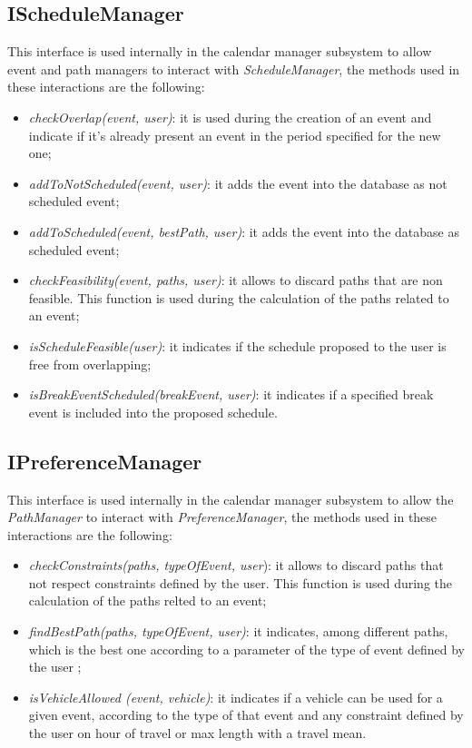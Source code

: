 \subsection{IScheduleManager}
This interface is used internally in the calendar manager subsystem to allow event and path managers to interact with \textit{ScheduleManager}, the methods used in these interactions are the following:
\begin{itemize}
\item \textit{checkOverlap(event, user)}: it is used during the creation of an event and indicate if it's already present an event in the period specified for the new one;
\item \textit{addToNotScheduled(event, user)}: it adds the event into the database as not scheduled event;
\item \textit{addToScheduled(event, bestPath, user)}: it adds the event into the database as scheduled event;
\item \textit{checkFeasibility(event, paths, user)}: it allows to discard paths that are non feasible. This function is used during the calculation of the paths related to an event;
\item \textit{isScheduleFeasible(user)}: it indicates if the schedule proposed to the user is free from overlapping;
\item \textit{isBreakEventScheduled(breakEvent, user)}: it indicates if a specified break event is included into the proposed schedule.
\end{itemize}

\subsection{IPreferenceManager}
This interface is used internally in the calendar manager subsystem to allow the \textit{PathManager} to interact with \textit{PreferenceManager}, the methods used in these interactions are the following:
\begin{itemize}
\item \textit{checkConstraints(paths, typeOfEvent, user}): it allows to discard paths that not respect constraints defined by the user. This function is used during the calculation of the paths relted to an event;
\item \textit{findBestPath(paths, typeOfEvent, user)}: it indicates, among different paths, which is the best one according to a parameter of the type of event defined by the user ;
\item \textit{isVehicleAllowed (event, vehicle)}: it indicates if a vehicle can be used for a given event, according to the type of that event and any constraint defined by the user on hour of travel or max length with a travel mean.
\end{itemize}

